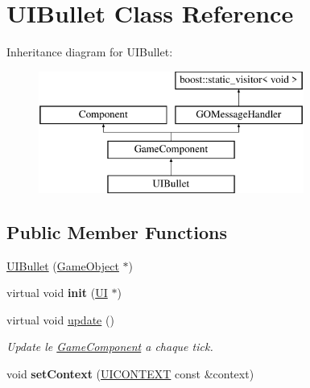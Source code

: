 \hypertarget{class_u_i_bullet}{}\section{U\+I\+Bullet Class Reference}
\label{class_u_i_bullet}
Inheritance diagram for U\+I\+Bullet\+:\begin{figure}[H]
\begin{center}
\leavevmode
\includegraphics[height=4.000000cm]{class_u_i_bullet}
\end{center}
\end{figure}
\subsection*{Public Member Functions}
\begin{DoxyCompactItemize}
\item 
\hyperlink{class_u_i_bullet_a5036f0f1649cbb182b46a37ba4096bc1}{U\+I\+Bullet} (\hyperlink{class_game_object}{Game\+Object} $\ast$)
\item 
\hypertarget{class_u_i_bullet_ae46362f308974901560ed12ab16d6b61}{}\label{class_u_i_bullet_ae46362f308974901560ed12ab16d6b61} 
virtual void {\bfseries init} (\hyperlink{class_u_i}{UI} $\ast$)
\item 
\hypertarget{class_u_i_bullet_ad88e53627d06397907b9537c809626ed}{}\label{class_u_i_bullet_ad88e53627d06397907b9537c809626ed} 
virtual void \hyperlink{class_u_i_bullet_ad88e53627d06397907b9537c809626ed}{update} ()
\begin{DoxyCompactList}\small\item\em Update le \hyperlink{class_game_component}{Game\+Component} a chaque tick. \end{DoxyCompactList}\item 
\hypertarget{class_u_i_bullet_a8433ca3e78d5ecde2c15a6d56eca1529}{}\label{class_u_i_bullet_a8433ca3e78d5ecde2c15a6d56eca1529} 
void {\bfseries set\+Context} (\hyperlink{struct_u_i_c_o_n_t_e_x_t}{U\+I\+C\+O\+N\+T\+E\+XT} const \&context)
\end{DoxyCompactItemize}
